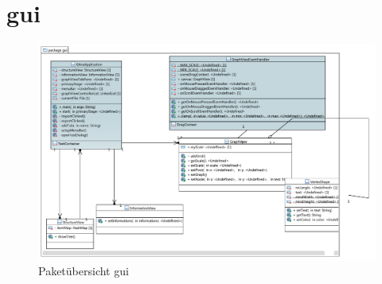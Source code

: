 \newpage

\section{gui}

\begin{figure}[hb]
  \centering
  \includegraphics[width=380pt]{resourcen/gui.pdf}
  \caption{Paketübersicht gui}
  \label{fig:packge_gui}
\end{figure}

